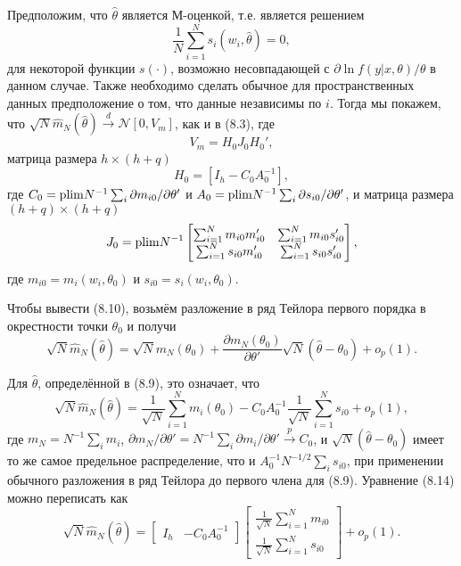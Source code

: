 Предположим, что $\hat{\theta}$ является М-оценкой, т.е. является решением 
\begin{equation}
\frac{1}{N} \sum_{i=1}^N s_i(w_i, \hat{\theta}) = 0,
\end{equation}
для некоторой функции $s(\cdot)$, возможно несовпадающей с $\partial{\ln f(y|x, \theta)}/\theta$ в данном случае. Также необходимо сделать обычное для пространственных данных предположение о том, что данные независимы по $i$. Тогда мы покажем, что $\sqrt{N}\hat{m}_N(\hat{\theta}) \stackrel{d}{\rightarrow} \mathcal{N}[0, V_m]$, как и в (8.3), где
\begin{equation}
V_m = H_0J_0H_0',
\end{equation} 
матрица размера $h \times (h + q)$
\begin{equation}
H_0 = [I_h - C_0A_0^{-1}],
\end{equation}
где $C_0 = \mathrm{plim } N^{-1} \sum_i \partial{m_{i0}}/\partial{\theta}'$ и $A_0 = \mathrm{plim } N^{-1} \sum_i \partial{s_{i0}}/\partial{\theta}'$, и матрица размера $(h + q) \times (h + q)$
\begin{equation}
J_0 = \mathrm{plim } N^{-1} \begin{bmatrix} \sum_{i=1}^N m_{i0} m_{i0}' &  \sum_{i=1}^N m_{i0} s_{i0}' \\ \sum_{i=1}^N s_{i0} m_{i0}' & \sum_{i=1}^N s_{i0} s_{i0}' \end{bmatrix},
\end{equation}
где $m_{i0} = m_i(w_i, \theta_0)$ и $s_{i0} = s_i(w_i, \theta_0)$.

Чтобы вывести (8.10), возьмём разложение в ряд Тейлора первого порядка в окрестности точки $\theta_0$ и получи
\begin{equation}
\sqrt{N}\hat{m}_N(\hat{\theta}) = \sqrt{N}m_N(\theta_0) + \frac{\partial{m_N(\theta_0)}}{\partial{\theta}'} \sqrt{N}(\hat{\theta} - \theta_0) + o_p(1).
\end{equation}

Для $\hat{\theta}$, определённой в (8.9), это означает, что
\begin{equation}
\sqrt{N}\hat{m}_N(\hat{\theta}) = \frac{1}{\sqrt{N}} \sum_{i=1}^N m_i(\theta_0) - C_0A_0^{-1}\frac{1}{\sqrt{N}} \sum_{i=1}^N s_{i0} + o_p(1), 
\end{equation}
где $m_N = N^{-1} \sum_i m_i$, $\partial{m_N}/\partial{\theta}' =  N^{-1} \sum_i \partial{m_i}/\partial{\theta}' \stackrel{p}{\rightarrow} C_0$, и $\sqrt{N}(\hat{\theta} - \theta_0)$ имеет то же самое предельное распределение, что и $A_0^{-1}N^{-1/2} \sum_i s_{i0}$, при применении обычного разложения в ряд Тейлора до первого члена для (8.9). Уравнение (8.14) можно переписать как
\begin{equation}
\sqrt{N}\hat{m}_N(\hat{\theta}) = \begin{bmatrix} I_h & - C_0A_0^{-1} \end{bmatrix} \begin{bmatrix}  \frac{1}{\sqrt{N}}\sum_{i=1}^N m_{i0} \\ \frac{1}{\sqrt{N}}\sum_{i=1}^N s_{i0} \end{bmatrix} + o_p(1).
\end{equation}

